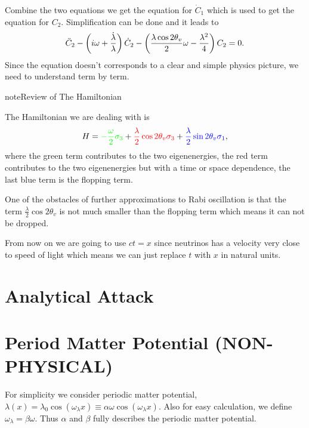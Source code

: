 \documentclass[letterpaper,12pt,english]{sphinxmanual}
\begin{document}
Combine the two equations we get the equation for \(\dot C_1\) which is used to get the equation for \(C_2\). Simplification can be done and it leads to
\begin{gather}
\begin{split}\ddot C_2 - \left( i \omega +  \frac{\dot \lambda}{\lambda}  \right) \dot C_2 - \left(   \frac{\lambda \cos 2\theta_v}{2} \omega  - \frac{\lambda^2}{4}   \right) C_2 = 0.\end{split}\notag
\end{gather}
Since the equation doesn't corresponds to a clear and simple physics picture, we need to understand term by term.

\begin{notice}{note}{Review of The Hamiltonian}

The Hamiltonian we are dealing with is
\begin{gather}
\begin{split}H = {\color{green}-\frac{\omega}{2} \sigma_3} + {\color{red}\frac{\lambda}{2} \cos 2\theta_v \sigma_3} + {\color{blue}\frac{\lambda}{2}\sin 2\theta_v \sigma_1},\end{split}\notag
\end{gather}
where the green term contributes to the two eigenenergies, the red term contributes to the two eigenenergies but with a time or space dependence, the last blue term is the flopping term.
\end{notice}

One of the obstacles of further approximations to Rabi oscillation is that the term \(\frac{\lambda}{2} \cos 2\theta_v\) is not much smaller than the flopping term which means it can not be dropped.

From now on we are going to use \(ct=x\) since neutrinos has a velocity very close to speed of light which means we can just replace \(t\) with \(x\) in natural units.


\section{Analytical Attack}
\label{matter-driven:analytical-attack}

\section{Period Matter Potential (NON-PHYSICAL)}
\label{matter-driven:period-matter-potential-non-physical}
For simplicity we consider periodic matter potential, \(\lambda(x) = \lambda_0 \cos(\omega_\lambda x) \equiv \alpha\omega \cos(\omega_\lambda x)\). Also for easy calculation, we define \(\omega_\lambda = \beta \omega\). Thus \(\alpha\) and \(\beta\) fully describes the periodic matter potential.
\end{document}
